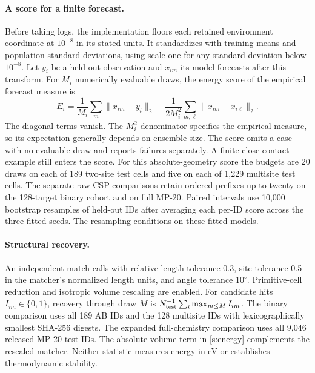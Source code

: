 \paragraph{A score for a finite forecast.}
Before taking logs, the implementation floors each retained environment coordinate at $10^{-8}$ in its stated units. It standardizes with training means and population standard deviations, using scale one for any standard deviation below $10^{-8}$. Let $y_i$ be a held-out observation and $x_{im}$ its model forecasts after this transform. For $M_i$ numerically evaluable draws, the energy score of the empirical forecast measure \cite{energy} is
\begin{equation}
 E_i=\frac1{M_i}\sum_m\|x_{im}-y_i\|_2
       -\frac1{2M_i^2}\sum_{m,\ell}\|x_{im}-x_{i\ell}\|_2 . \label{s:energy}
\end{equation}
The diagonal terms vanish. The $M_i^2$ denominator specifies the empirical measure, so its expectation generally depends on ensemble size. The score omits a case with no evaluable draw and reports failures separately. A finite close-contact example still enters the score. For this absolute-geometry score the budgets are 20 draws on each of 189 two-site test cells and five on each of 1,229 multisite test cells. The separate raw CSP comparisons retain ordered prefixes up to twenty on the 128-target binary cohort and on full MP-20. Paired intervals use 10,000 bootstrap resamples of held-out IDs after averaging each per-ID score across the three fitted seeds. The resampling conditions on these fitted models.

\paragraph{Structural recovery.}
An independent match calls  with relative length tolerance 0.3, site tolerance 0.5 in the matcher's normalized length units, and angle tolerance $10^\circ$. Primitive-cell reduction and isotropic volume rescaling are enabled. For candidate hits $I_{im}\in\{0,1\}$, recovery through draw $M$ is $N_{\rm test}^{-1}\sum_i\max_{m\le M} I_{im}$. The binary comparison uses all 189 AB IDs and the 128 multisite IDs with lexicographically smallest SHA-256 digests. The expanded full-chemistry comparison uses all 9,046 released MP-20 test IDs. The absolute-volume term in \eqref{s:energy} complements the rescaled matcher. Neither statistic measures energy in eV or establishes thermodynamic stability.

